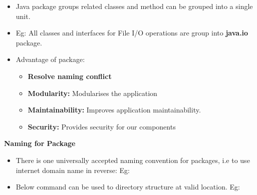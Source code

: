 \setlength{\columnsep}{3pt}
\begin{flushleft}

	\begin{itemize}
		\item Java package groups related classes and method can be grouped into a single unit.
		\item Eg: All classes and interfaces for File I/O operations are group into \textbf{java.io} package.
		\item Advantage of package:
		\begin{itemize}
			\item \textbf{Resolve naming conflict}
			\item \textbf{Modularity:} Modularises the application
			\item \textbf{Maintainability:} Improves application maintainability.
			\item \textbf{Security:} Provides security for our components
		\end{itemize}

	\end{itemize}

	\textbf{Naming for Package}
	\begin{itemize}
		\item There is one universally accepted naming convention for packages, i.e to use internet domain name in reverse:
		\newline
		Eg:
		\bigskip
		
 		\item Below command can be used to directory structure at valid location.
 		\bigskip
 		\newpage
 		Eg:
 		

\end{itemize}
\end{flushleft}
